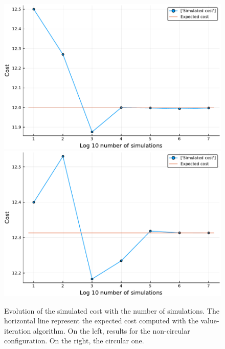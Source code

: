 \begin{figure}[H]
\centering
\includegraphics[scale=0.41]{../img/board_right_high/cost_iterations_log_noncirc.pdf}
\includegraphics[scale=0.41]{../img/board_right_high/cost_iterations_log_circ.pdf}
\caption{Evolution of the simulated cost with the number of simulations. The horizontal line represent the expected cost computed with the value-iteration algorithm. On the left, results for the non-circular configuration. On the right, the circular one.}
\label{fig:cost_iterations_log_right}
\end{figure}

